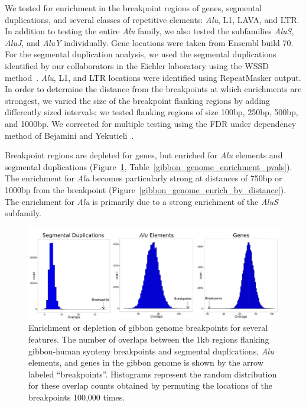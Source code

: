 We tested for enrichment in the breakpoint regions of genes, segmental duplications, and several classes of repetitive elements: \emph{Alu}, L1, LAVA, and LTR. In addition to testing the entire \emph{Alu} family, we also tested the subfamilies \emph{AluS}, \emph{AluJ}, and \emph{AluY} individually. Gene locations were taken from Ensembl build 70. For the segmental duplication analysis, we used the segmental duplications identified by our collaborators in the Eichler laboratory using the WSSD method~\cite{Bailey:2002jp}. \emph{Alu}, L1, and LTR locations were identified using RepeatMasker output. In order to determine the distance from the breakpoints at which enrichments are strongest, we varied the size of the breakpoint flanking regions by adding differently sized intervals; we tested flanking regions of size 100bp, 250bp, 500bp, and 1000bp. We corrected for multiple testing using the FDR under dependency method of Bejamini and Yekutieli~\cite{Benjamini:2001fs}. 

Breakpoint regions are depleted for genes, but enriched for \emph{Alu} elements and segmental duplications (Figure~\ref{gibbon_genome_histograms}, Table~\ref{gibbon_genome_enrichment_pvals}). The enrichment for \emph{Alu} becomes particularly strong at distances of 750bp or 1000bp from the breakpoint (Figure~\ref{gibbon_genome_enrich_by_distance}). The enrichment for \emph{Alu} is primarily due to a strong enrichment of the \emph{AluS} subfamily.

\begin{figure}
\centering
\includegraphics[width=.9\textwidth]{figures/gibbon_genome_histograms.pdf}
\caption{Enrichment or depletion of gibbon genome breakpoints for several features. The number of overlaps between the 1kb regions flanking gibbon-human synteny breakpoints and segmental duplications, \emph{Alu} elements, and genes in the gibbon genome is shown by the arrow labeled ``breakpoints''. Histograms represent the random distribution for these overlap counts obtained by permuting the locations of the breakpoints 100,000 times.}
\label{gibbon_genome_histograms}
\end{figure}

